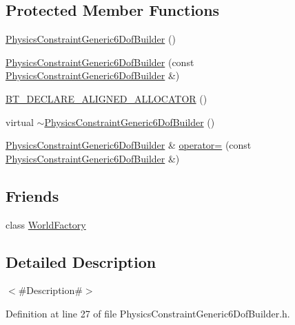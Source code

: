 \subsection*{Protected Member Functions}
\begin{DoxyCompactItemize}
\item 
\mbox{\hyperlink{classnjli_1_1_physics_constraint_generic6_dof_builder_a9873aa55e683d5d7695ec0e0348a4f10}{Physics\+Constraint\+Generic6\+Dof\+Builder}} ()
\item 
\mbox{\hyperlink{classnjli_1_1_physics_constraint_generic6_dof_builder_ae3cf05f6e1f05f3257695e60f02bb4ff}{Physics\+Constraint\+Generic6\+Dof\+Builder}} (const \mbox{\hyperlink{classnjli_1_1_physics_constraint_generic6_dof_builder}{Physics\+Constraint\+Generic6\+Dof\+Builder}} \&)
\item 
\mbox{\hyperlink{classnjli_1_1_physics_constraint_generic6_dof_builder_abf75fdddeaad061b3540fc62da0d809a}{B\+T\+\_\+\+D\+E\+C\+L\+A\+R\+E\+\_\+\+A\+L\+I\+G\+N\+E\+D\+\_\+\+A\+L\+L\+O\+C\+A\+T\+OR}} ()
\item 
virtual \mbox{\hyperlink{classnjli_1_1_physics_constraint_generic6_dof_builder_a9f8d43b92426005f9775051a4208db3c}{$\sim$\+Physics\+Constraint\+Generic6\+Dof\+Builder}} ()
\item 
\mbox{\hyperlink{classnjli_1_1_physics_constraint_generic6_dof_builder}{Physics\+Constraint\+Generic6\+Dof\+Builder}} \& \mbox{\hyperlink{classnjli_1_1_physics_constraint_generic6_dof_builder_aaf3ffd63926492c362674c9844ab32a8}{operator=}} (const \mbox{\hyperlink{classnjli_1_1_physics_constraint_generic6_dof_builder}{Physics\+Constraint\+Generic6\+Dof\+Builder}} \&)
\end{DoxyCompactItemize}
\subsection*{Friends}
\begin{DoxyCompactItemize}
\item 
class \mbox{\hyperlink{classnjli_1_1_physics_constraint_generic6_dof_builder_acb96ebb09abe8f2a37a915a842babfac}{World\+Factory}}
\end{DoxyCompactItemize}


\subsection{Detailed Description}
$<$\#\+Description\#$>$ 

Definition at line 27 of file Physics\+Constraint\+Generic6\+Dof\+Builder.\+h.



